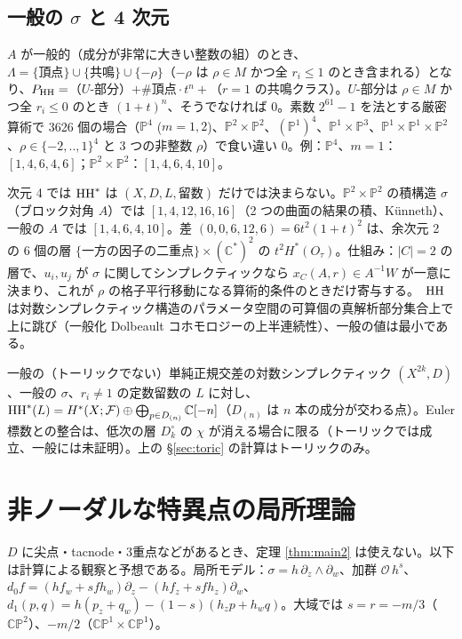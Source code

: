 \subsection{一般の $\sigma$ と 4 次元}
\begin{obs}[\tV]
$A$ が一般的（成分が非常に大きい整数の組）のとき、$\Lambda=\{\text{頂点}\}\cup\{\text{共鳴}\}\cup\{-\rho\}$（$-\rho$ は $\rho\in M$ かつ全 $r_i\le1$ のとき含まれる）となり、$P_{\mathrm{HH}}=$（$U$-部分）$+\#\text{頂点}\cdot t^n+$（$r=1$ の共鳴クラス）。$U$-部分は $\rho\in M$ かつ全 $r_i\le0$ のとき $(1+t)^n$、そうでなければ 0。素数 $2^{61}-1$ を法とする厳密算術で 3626 個の場合（$\mathbb P^4$ ($m=1,2$)、$\mathbb P^2\times\mathbb P^2$、$(\mathbb P^1)^4$、$\mathbb P^1\times\mathbb P^3$、$\mathbb P^1\times\mathbb P^1\times\mathbb P^2$、$\rho\in\{-2,..,1\}^4$ と 3 つの非整数 $\rho$）で食い違い 0。例：$\mathbb P^4$、$m=1$：$[1,4,6,4,6]$；$\mathbb P^2\times\mathbb P^2$：$[1,4,6,4,10]$。
\end{obs}
\begin{obs}\label{obs:arith}
次元 4 では $\mathrm{HH}^*$ は $(X,D,L,\text{留数})$ だけでは決まらない。$\mathbb P^2\times\mathbb P^2$ の積構造 $\sigma$（ブロック対角 $A$）では $[1,4,12,16,16]$（2 つの曲面の結果の積、Künneth）、一般の $A$ では $[1,4,6,4,10]$。差 $(0,0,6,12,6)=6t^2(1+t)^2$ は、余次元 2 の 6 個の層 $\{\text{一方の因子の二重点}\}\times(\mathbb C^*)^2$ の $t^2H^*(O_\tau)$。仕組み：$|C|=2$ の層で、$u_i,u_j$ が $\sigma$ に関してシンプレクティックなら $x_C(A,r)\in A^{-1}W$ が一意に決まり、これが $\rho$ の格子平行移動になる算術的条件のときだけ寄与する。\tK\ $\mathrm{HH}$ は対数シンプレクティック構造のパラメータ空間の可算個の真解析部分集合上で上に跳び（一般化 Dolbeault コホモロジーの上半連続性）、一般の値は最小である。
\end{obs}
\begin{conj}[一般の単純正規交差 $D$]\tK
一般の（トーリックでない）単純正規交差の対数シンプレクティック $(X^{2k},D)$、一般の $\sigma$、$r_i\ne1$ の定数留数の $L$ に対し、$\mathrm{HH}^*(L)=H^*(X;\mathcal F)\oplus\bigoplus_{p\in D_{(n)}}\mathbb C[-n]$（$D_{(n)}$ は $n$ 本の成分が交わる点）。Euler 標数との整合は、低次の層 $D_k^\circ$ の $\chi$ が消える場合に限る（トーリックでは成立、一般には未証明）。上の \S\ref{sec:toric} の計算はトーリックのみ。
\end{conj}

\section{非ノーダルな特異点の局所理論}\label{sec:local}
$D$ に尖点・tacnode・3重点などがあるとき、定理 \ref{thm:main2} は使えない。以下は計算による観察と予想である。局所モデル：$\sigma=h\,\partial_z\wedge\partial_w$、加群 $\mathcal O\,h^s$、$d_0f=(hf_w+sfh_w)\partial_z-(hf_z+sfh_z)\partial_w$、$d_1(p,q)=h(p_z+q_w)-(1-s)(h_zp+h_wq)$。大域では $s=r=-m/3$（$\mathbb{CP}^2$）、$-m/2$（$\mathbb{CP}^1\times\mathbb{CP}^1$）。

